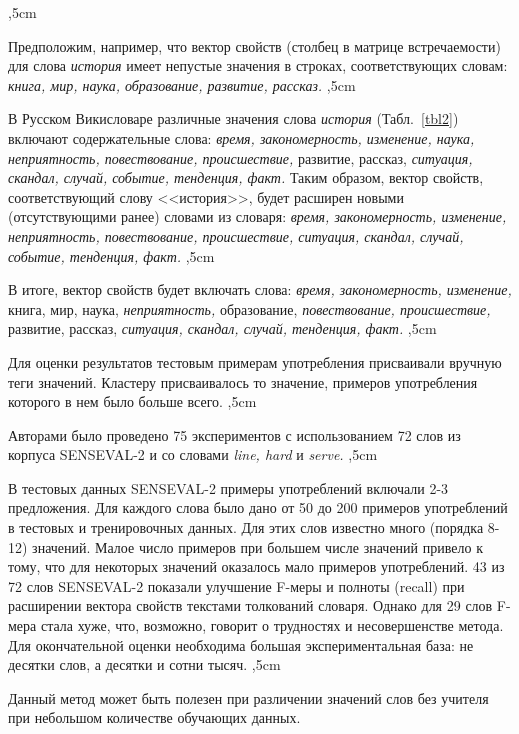 \documentclass{article}
\begin{document}
\begin{articletext}
,5cm

Предположим, например, что вектор свойств (столбец в матрице встречаемости) для слова \textit{история} имеет непустые значения в строках, соответствующих словам: \textit{книга, мир, наука, образование, развитие, рассказ.}
,5cm 

В Русском Викисловаре различные значения слова \textit{история} (Табл.~\ref{tbl2}) включают содержательные слова: \textit{время, закономерность, изменение, наука, неприятность, повествование, происшествие,} развитие, рассказ, \textit{ситуация, скандал, случай, событие, тенденция, факт.} Таким образом, вектор свойств, соответствующий слову <<история>>, будет расширен новыми (отсутствующими ранее) словами из словаря: \textit{время, закономерность, изменение, неприятность, повествование, происшествие, ситуация, скандал, случай, событие, тенденция, факт.}
,5cm

В итоге, вектор свойств будет включать слова: \textit{время, закономерность, изменение,} книга, мир, наука, \textit{неприятность,} образование, \textit{повествование, происшествие,} развитие, рассказ, \textit{ситуация, скандал, случай, тенденция, факт.}
,5cm

Для оценки результатов тестовым примерам употребления присваивали вручную теги значений. Кластеру присваивалось то значение, примеров употребления которого в нем было больше всего. 
,5cm

Авторами было проведено 75 экспериментов с использованием 72 слов из корпуса SENSEVAL-2 и со словами \textit{line, hard} и \textit{serve.}
,5cm

В тестовых данных SENSEVAL-2 примеры употреблений включали 2-3 предложения. Для каждого слова было дано от 50 до 200 примеров употреблений в тестовых и тренировочных данных. Для этих слов известно много (порядка 8-12) значений. Малое число примеров при большем числе значений привело к тому, что для некоторых значений оказалось мало примеров употреблений. 43 из 72 слов SENSEVAL-2 показали улучшение F-меры и полноты (recall) при расширении вектора свойств текстами толкований словаря. Однако для 29 слов F-мера стала хуже, что, возможно, говорит о трудностях и несовершенстве метода. Для окончательной оценки необходима большая экспериментальная база: не десятки слов, а десятки и сотни тысяч.
,5cm

Данный метод может быть полезен при различении  значений слов без учителя при небольшом количестве обучающих данных.


\end{articletext}
\end{document}
